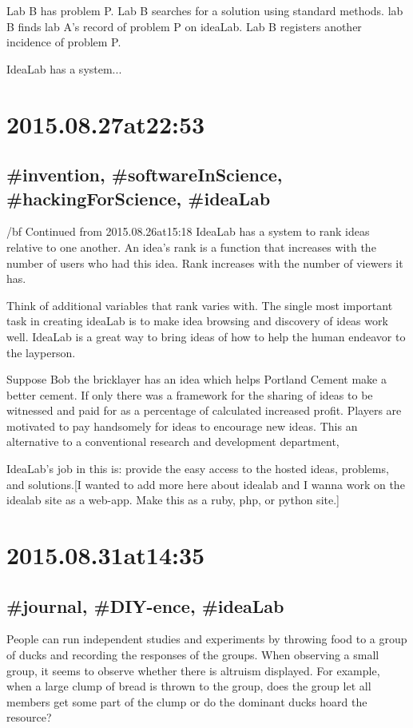 \begin{enumerate}
Lab B has problem P. Lab B searches for a solution using standard methods. lab B finds lab A's record of problem P on ideaLab. Lab B registers another incidence of problem P.

IdeaLab has a system...

\section*{2015.08.27at22:53}
\subsection*{\#invention, \#softwareInScience, \#hackingForScience, \#ideaLab}
{/bf Continued from 2015.08.26at15:18}
IdeaLab has a system to rank ideas relative to one another. An idea's rank is a function that increases with the number of users who had this idea. Rank increases with the number of viewers it has.

Think of additional variables that rank varies with. The single most important task in creating ideaLab is to make idea browsing and discovery of ideas work well. IdeaLab is a great way to bring ideas of how to help the human endeavor to the layperson.

Suppose Bob the bricklayer has an idea which helps Portland Cement make a better cement. If only there was a framework for the sharing of ideas to be witnessed and paid for as a percentage of calculated increased profit. Players are motivated to pay handsomely for ideas to encourage new ideas. This an alternative to a conventional research and development department,

IdeaLab's job in this is:  provide the easy access to the hosted ideas, problems, and solutions.[I wanted to add more here about idealab and I wanna work on the idealab site as a web-app. Make this as a ruby, php, or python site.]

\section*{2015.08.31at14:35}
\subsection*{\#journal, \#DIY-ence, \#ideaLab}
People can run independent studies and experiments by throwing food to a group of ducks and recording the responses of the groups. When observing a small group, it seems to observe whether there is altruism displayed. For example, when a large clump of bread is thrown to the group, does the group let all members get some part of the clump or do the dominant ducks hoard the resource?


\end{enumerate}

